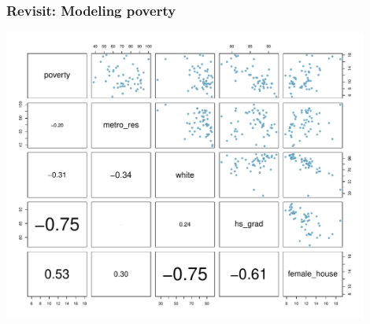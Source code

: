 \begin{frame}
\frametitle{Revisit: Modeling poverty}

\vspace{-0.75cm}

\begin{center}
\includegraphics[width=0.9\textwidth]{9-1_intro_mlr/figures/poverty/poverty}
\end{center}

\end{frame}



